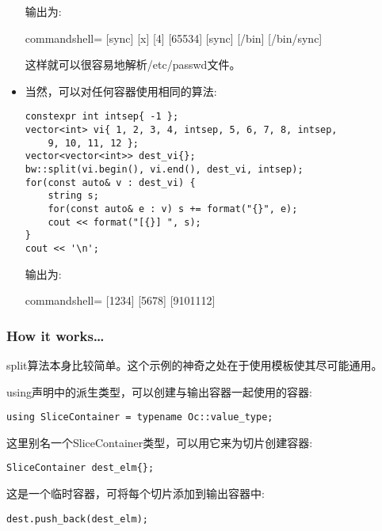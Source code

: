 \begin{itemize}
输出为:

\begin{tcblisting}{commandshell={}}
[sync] [x] [4] [65534] [sync] [/bin] [/bin/sync]
\end{tcblisting}

这样就可以很容易地解析/etc/passwd文件。

\item 
当然，可以对任何容器使用相同的算法:

\begin{lstlisting}[style=styleCXX]
constexpr int intsep{ -1 };
vector<int> vi{ 1, 2, 3, 4, intsep, 5, 6, 7, 8, intsep,
	9, 10, 11, 12 };
vector<vector<int>> dest_vi{};
bw::split(vi.begin(), vi.end(), dest_vi, intsep);
for(const auto& v : dest_vi) {
	string s;
	for(const auto& e : v) s += format("{}", e);
	cout << format("[{}] ", s);
}
cout << '\n';
\end{lstlisting}

输出为:

\begin{tcblisting}{commandshell={}}
[1234] [5678] [9101112]
\end{tcblisting}
\end{itemize}

\subsubsection{How it works…}

split算法本身比较简单。这个示例的神奇之处在于使用模板使其尽可能通用。

using声明中的派生类型，可以创建与输出容器一起使用的容器:

\begin{lstlisting}[style=styleCXX]
using SliceContainer = typename Oc::value_type;
\end{lstlisting}

这里别名一个SliceContainer类型，可以用它来为切片创建容器:

\begin{lstlisting}[style=styleCXX]
SliceContainer dest_elm{};
\end{lstlisting}

这是一个临时容器，可将每个切片添加到输出容器中:

\begin{lstlisting}[style=styleCXX]
dest.push_back(dest_elm);
\end{lstlisting}








